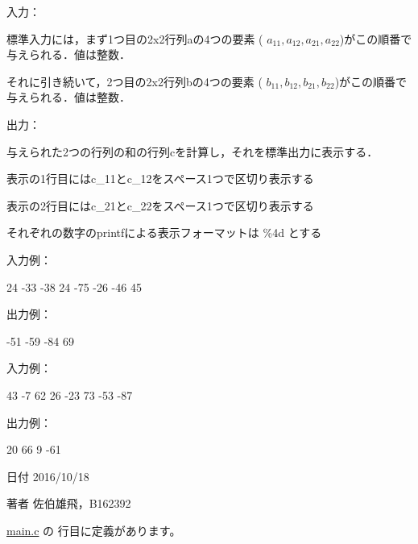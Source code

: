 入力：
\begin{DoxyItemize}
\item 標準入力には，まず1つ目の2x2行列aの4つの要素 ( $ a_11,a_12,a_21,a_22 $)がこの順番で与えられる．値は整数．
\item それに引き続いて，2つ目の2x2行列bの4つの要素 ( $ b_11,b_12,b_21,b_22 $)がこの順番で与えられる．値は整数．
\end{DoxyItemize}

出力：
\begin{DoxyItemize}
\item 与えられた2つの行列の和の行列cを計算し，それを標準出力に表示する．
\item 表示の1行目にはc\-\_\-11とc\-\_\-12をスペース1つで区切り表示する
\item 表示の2行目にはc\-\_\-21とc\-\_\-22をスペース1つで区切り表示する
\item それぞれの数字のprintfによる表示フォーマットは \%4d とする
\end{DoxyItemize}

入力例： \begin{DoxyVerb}24 -33 -38 24 -75 -26 -46 45
\end{DoxyVerb}
 出力例： \begin{DoxyVerb} -51  -59
 -84   69
\end{DoxyVerb}
 入力例： \begin{DoxyVerb}43 -7 62 26 -23 73 -53 -87
\end{DoxyVerb}
 出力例： \begin{DoxyVerb}  20   66
   9  -61
\end{DoxyVerb}
 \begin{DoxyDate}{日付}
2016/10/18 
\end{DoxyDate}
\begin{DoxyAuthor}{著者}
佐伯雄飛，\-B162392 
\end{DoxyAuthor}


 \hyperlink{main_8c_source}{main.\-c} の  行目に定義があります。


